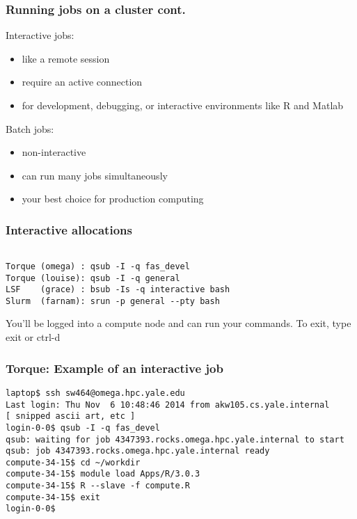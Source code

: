 \documentclass[10pt]{beamer}
\begin{document}
\begin{frame}[fragile]
\frametitle{Running jobs on a cluster cont.}

Interactive jobs:
\begin{itemize}
\item like a remote session
\item require an active connection
\item for development, debugging, or 
interactive environments like R and Matlab 
\end{itemize}
\vskip10pt

Batch jobs:
\begin{itemize}
\item non-interactive  
\item can run many jobs simultaneously
\item your best choice for production computing
\end{itemize}
\end{frame}

\begin{frame}[fragile]
\frametitle{Interactive allocations}

\begin{verbatim}

Torque (omega) : qsub -I -q fas_devel
Torque (louise): qsub -I -q general 
LSF    (grace) : bsub -Is -q interactive bash
Slurm  (farnam): srun -p general --pty bash

\end{verbatim}

You'll be logged into a compute node and can run your commands. To exit,
type exit or ctrl-d

\end{frame}

\begin{frame}[fragile]
\frametitle{Torque: Example of an interactive job}
\begin{verbatim}
laptop$ ssh sw464@omega.hpc.yale.edu
Last login: Thu Nov  6 10:48:46 2014 from akw105.cs.yale.internal
[ snipped ascii art, etc ]
login-0-0$ qsub -I -q fas_devel
qsub: waiting for job 4347393.rocks.omega.hpc.yale.internal to start
qsub: job 4347393.rocks.omega.hpc.yale.internal ready
compute-34-15$ cd ~/workdir
compute-34-15$ module load Apps/R/3.0.3
compute-34-15$ R --slave -f compute.R
compute-34-15$ exit 
login-0-0$ 
\end{verbatim}
\end{frame}
\end{document}
